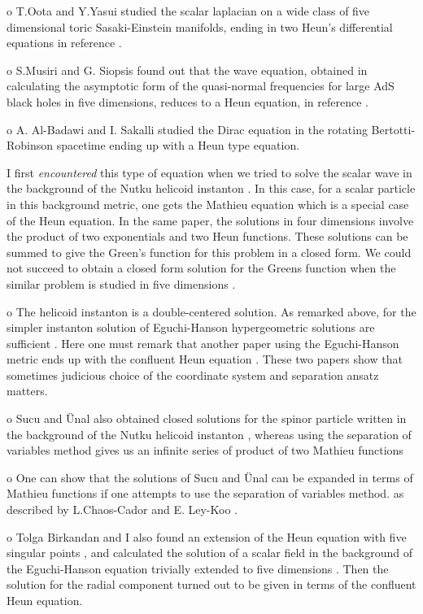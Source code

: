 \documentclass{article}
\begin{document}
o T.Oota and Y.Yasui studied the scalar laplacian on a wide class
of five dimensional toric Sasaki-Einstein manifolds, ending in two
Heun's differential equations in reference \cite{oota}.


o S.Musiri and G. Siopsis found out that the wave equation,
obtained in calculating the asymptotic form of the quasi-normal
frequencies for large AdS black holes in five dimensions, reduces
to a Heun equation, in reference \cite{Musiri}.


o A. Al-Badawi and I. Sakalli studied the Dirac equation in the
rotating Bertotti-Robinson spacetime \cite{sakalli} ending up with
a Heun type equation.

\noindent I first \emph{encountered} this type of equation when we
tried to solve the scalar wave in the background of the Nutku
helicoid instanton \cite{Yavuz2}. In this case, for a scalar
particle in this background metric, one gets the Mathieu equation
which is a special case of the Heun equation. In the same paper,
the solutions in four dimensions involve the product of two
exponentials and two Heun functions. These solutions can be summed
to give the Green's function for  this problem in a closed form.
We could not succeed to obtain a closed form solution for the
Greens function when the similar problem is studied in five
dimensions \cite {tolga1, tolga3}.

o The helicoid instanton is a double-centered solution. As
remarked above, for the simpler instanton solution of
Eguchi-Hanson \cite{ Eguchi} hypergeometric solutions are
sufficient \cite{Nuri}. Here one must remark that another paper
using the Eguchi-Hanson metric ends up with the confluent Heun
equation \cite {Malmendier}. These two papers show that sometimes
judicious choice of the coordinate system and separation ansatz
matters.


o Sucu and \"{U}nal also obtained closed solutions for the spinor
particle written in the background of the Nutku helicoid instanton
\cite{Nuri}, whereas using the separation of variables method
gives us an infinite series of product of two Mathieu functions
\cite {tolga1}


o One can show that the solutions of Sucu and \"{U}nal can be
expanded in terms of Mathieu functions if one attempts to use the
separation of variables method. as described by L.Chaos-Cador and
E. Ley-Koo \cite{Chaos}.


o  Tolga Birkandan  and I also found an extension of the Heun
equation with five singular points \cite{tolga2}, and calculated
the solution of a scalar field in the background of the
Eguchi-Hanson equation trivially extended to five dimensions
\cite{tolga2}. Then the solution for  the radial component turned
out to be given in terms of the confluent Heun equation.
\end{document}
